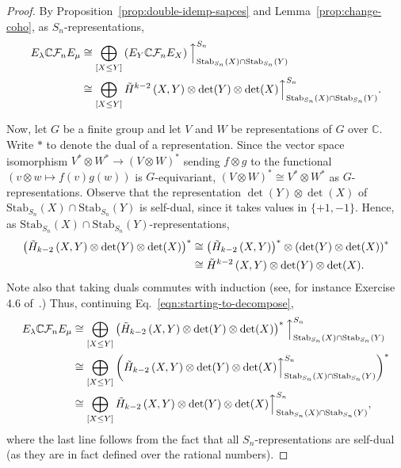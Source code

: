 \documentclass[ALCO, Unicode]{cedram}
\def\C{{\mathbb{C}}}
\def\stab{\mathrm{Stab}}
\begin{document}
\begin{proof}
By Proposition~\ref{prop:double-idemp-sapces} and Lemma~\ref{prop:change-coho}, as $S_n$-representations,
\begin{align}\label{eqn:starting-to-decompose}
\begin{split}
     E_\lambda \C \mathcal{F}_n E_\mu &\cong \bigoplus_{ [X \leq Y]} \left(E_Y \C \mathcal{F}_n E_X\right)\Big\uparrow_{\stab_{S_n}(X) \cap \stab_{S_n}(Y)}^{S_n}\\
    &\cong\bigoplus_{ [X \leq Y]} \Tilde{H}^{k - 2}\left(X, Y\right) \otimes \det(Y) \otimes \det(X)\Big\uparrow_{\stab_{S_n}(X) \cap \stab_{S_n}(Y)}^{S_n}.
    \end{split}
\end{align}

 Now, let $G$ be a finite group and let $V$ and $W$ be representations of $G$ over $\C.$ Write $\ast$ to denote the dual of a representation.
Since the vector space isomorphism $V^\ast \otimes W^\ast \to \left(V \otimes W\right)^\ast$ sending $f \otimes g$ to the functional $(v \otimes w \mapsto f(v)g(w))$ is $G$-equivariant, $\left(V \otimes W\right)^\ast \cong V^\ast \otimes W^\ast$ as $G$-representations. Observe that the representation $\det(Y) \otimes \det(X)$ of $\stab_{S_n}(X) \cap \stab_{S_n}(Y)$ is self-dual, since it takes values in $\{+1, -1\}.$ Hence, as $\stab_{S_n}(X) \cap \stab_{S_n}(Y)$-representations,
\begin{align*}
    \left(\Tilde{H}_{k - 2}\left(X, Y\right) \otimes \det(Y) \otimes \det(X)\right)^{\ast} &\cong  \left(\Tilde{H}_{k - 2}\left(X, Y\right) \right)^\ast \otimes \left(\det(Y) \otimes \det(X)\right)^\ast\\
    &\cong \Tilde{H}^{k - 2}\left(X, Y\right) \otimes \det(Y) \otimes \det(X).
\end{align*}
Note also that taking duals commutes with induction (see, for instance Exercise 4.6 of~\cite{webbrepntheory}.) Thus, continuing Eq.~\eqref{eqn:starting-to-decompose},
\begin{align*}
    E_\lambda \C \mathcal{F}_n E_\mu 
    &\cong\bigoplus_{ [X \leq Y]} \left(\Tilde{H}_{k - 2}\left(X, Y\right) \otimes \det(Y) \otimes \det(X)\right)^{\ast}\Big\uparrow_{\stab_{S_n}(X) \cap \stab_{S_n}(Y)}^{S_n} \\
    &\cong \bigoplus_{ [X \leq Y]}\left(\Tilde{H}_{k - 2}\left(X, Y\right) \otimes \det(Y) \otimes \det(X)\Big\uparrow_{\stab_{S_n}(X) \cap \stab_{S_n}(Y)}^{S_n}\right)^\ast\\
     &\cong \bigoplus_{ [X \leq Y]}\Tilde{H}_{k - 2}\left(X, Y\right) \otimes \det(Y) \otimes \det(X)\Big\uparrow_{\stab_{S_n}(X) \cap \stab_{S_n}(Y)}^{S_n},
\end{align*}
where the last line follows from the fact that all $S_n$-representations are self-dual (as they are in fact defined over the rational numbers).
\end{proof}
\end{document}
